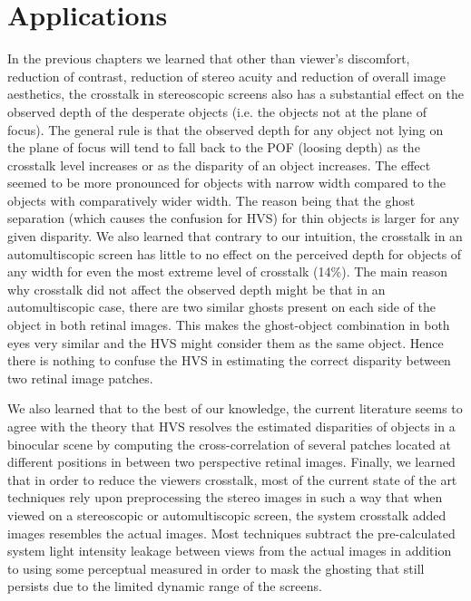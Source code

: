\chapter{Applications}
\label{chap:applicatons}
In the previous chapters we learned that other than viewer's discomfort, reduction of contrast, reduction of stereo acuity and reduction of overall image aesthetics, the crosstalk in stereoscopic screens also has a substantial effect on the observed depth of the desperate objects (i.e. the objects not at the plane of focus). The general rule is that the observed depth for any object not lying on the plane of focus will tend to fall back to the POF (loosing depth) as the crosstalk level increases or as the disparity of an object increases. The effect seemed to be more pronounced for objects with narrow width compared to the objects with comparatively wider width. The reason being that the ghost separation (which causes the confusion for HVS) for thin objects is larger for any given disparity. We also learned that contrary to our intuition, the crosstalk in an automultiscopic screen has little to no effect on the perceived depth for objects of any width for even the most extreme level of crosstalk (14\%). The main reason why crosstalk  did not affect the observed depth might be that in an automultiscopic case, there are two similar ghosts present on each side of the object in both retinal images. This makes the ghost-object combination in both eyes very similar and the HVS might consider them as the same object. Hence there is nothing to confuse the HVS in estimating the correct disparity between two retinal image patches.

We also learned that to the best of our knowledge, the current literature seems to agree with the theory that HVS resolves the estimated disparities of objects in a binocular scene by computing the cross-correlation of several patches located at different positions in between two perspective retinal images. Finally, we learned that in order to reduce the viewers crosstalk, most of the current state of the art techniques rely upon preprocessing the stereo images in such a way that when viewed on a stereoscopic or automultiscopic screen, the system crosstalk added images resembles the actual images. Most techniques subtract the pre-calculated system light intensity leakage between views from the actual images in addition to using some perceptual measured in order to mask the ghosting that still persists due to the limited dynamic range of the screens.

